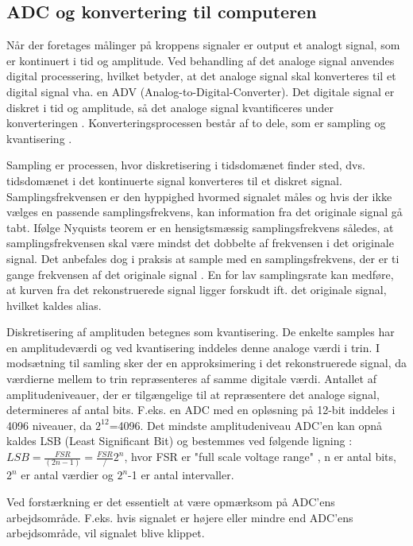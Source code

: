 \subsection{ADC og konvertering til computeren}
Når der foretages målinger på kroppens signaler er output et analogt signal, som er kontinuert i tid og amplitude. Ved behandling af det analoge signal anvendes digital processering, hvilket betyder, at det analoge signal skal konverteres til et digital signal vha. en ADV (Analog-to-Digital-Converter). Det digitale signal er diskret i tid og amplitude, så det analoge signal kvantificeres under konverteringen \cite{Webster2009}. Konverteringsprocessen består af to dele, som er sampling og kvantisering \cite{Zouridakis2003}.  

Sampling er processen, hvor diskretisering i tidsdomænet finder sted, dvs. tidsdomænet i det kontinuerte signal konverteres til et diskret signal. Samplingsfrekvensen er den hyppighed hvormed signalet måles og hvis der ikke vælges en passende samplingsfrekvens, kan information fra det originale signal gå tabt. Ifølge Nyquists teorem er en hensigtsmæssig samplingsfrekvens således, at samplingsfrekvensen skal være mindst det dobbelte af frekvensen i det originale signal. \cite{Zouridakis2003} Det anbefales dog i praksis at sample med en samplingsfrekvens, der er ti gange frekvensen af det originale signal . En for lav samplingsrate kan medføre, at kurven fra det rekonstruerede signal ligger forskudt ift. det originale signal, hvilket kaldes alias. \cite{Zouridakis2003}
 
Diskretisering af amplituden betegnes som kvantisering. De enkelte samples har en amplitudeværdi og ved kvantisering inddeles denne analoge værdi i trin. I modsætning til samling sker der en approksimering i det rekonstruerede signal, da værdierne mellem to trin repræsenteres af samme digitale værdi. \cite{Zouridakis2003} Antallet af amplitudeniveauer, der er tilgængelige til at repræsentere det analoge signal, determineres af antal bits. F.eks. en ADC med en opløsning på 12-bit inddeles i 4096 niveauer, da $2^12$=4096. \cite{Konrad2006} Det mindste amplitudeniveau ADC'en kan opnå kaldes LSB (Least Significant Bit) og bestemmes ved følgende ligning : 
$LSB = \frac{FSR}{(2n-1)} = \frac{FSR}/{2^n}$, hvor FSR er "full scale voltage range" , n er antal bits, $2^n$ er antal værdier og $2^n$-1 er antal intervaller. 

Ved forstærkning er det essentielt at være opmærksom på ADC'ens  arbejdsområde. F.eks. hvis signalet er højere eller mindre end ADC'ens arbejdsområde, vil signalet blive klippet.  
 

 